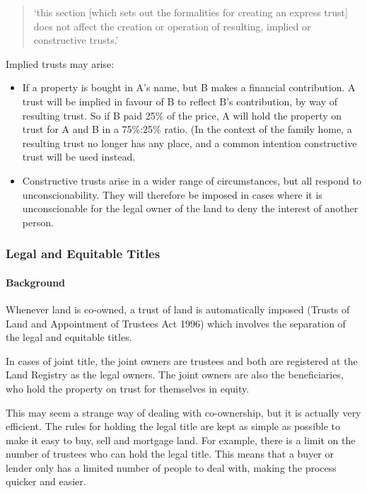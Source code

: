 \documentclass[
]{article}
\providecommand{\tightlist}{%
  \setlength{\itemsep}{0pt}\setlength{\parskip}{0pt}}
\begin{document}
\begin{quote}
`this section {[}which sets out the formalities for creating an express
trust{]} does not affect the creation or operation of resulting, implied
or constructive trusts.'
\end{quote}

Implied trusts may arise:

\begin{itemize}
\tightlist
\item
  If a property is bought in A's name, but B makes a financial
  contribution. A trust will be implied in favour of B to reflect B's
  contribution, by way of resulting trust. So if B paid 25\% of the
  price, A will hold the property on trust for A and B in a 75\%:25\%
  ratio. (In the context of the family home, a resulting trust no longer
  has any place, and a common intention constructive trust will be used
  instead.
\item
  Constructive trusts arise in a wider range of circumstances, but all
  respond to unconscionability. They will therefore be imposed in cases
  where it is unconscionable for the legal owner of the land to deny the
  interest of another person.
\end{itemize}

\hypertarget{legal-and-equitable-titles}{%
\subsubsection{Legal and Equitable
Titles}\label{legal-and-equitable-titles}}

\hypertarget{background}{%
\paragraph{Background}\label{background}}

Whenever land is co-owned, a trust of land is automatically imposed
(Trusts of Land and Appointment of Trustees Act 1996) which involves the
separation of the legal and equitable titles.

In cases of joint title, the joint owners are trustees and both are
registered at the Land Registry as the legal owners. The joint owners
are also the beneficiaries, who hold the property on trust for
themselves in equity.

This may seem a strange way of dealing with co-ownership, but it is
actually very efficient. The rules for holding the legal title are kept
as simple as possible to make it easy to buy, sell and mortgage land.
For example, there is a limit on the number of trustees who can hold the
legal title. This means that a buyer or lender only has a limited number
of people to deal with, making the process quicker and easier.
\end{document}
